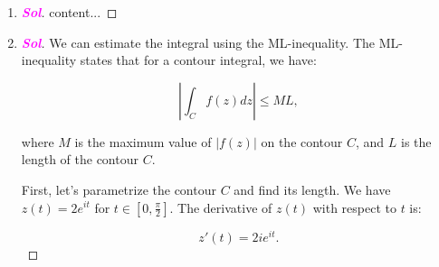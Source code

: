 \documentclass{article}
\theoremstyle{definition}
\newcommand{\sol}{\textcolor{magenta}{\bf Sol}}
\begin{document}
\begin{enumerate}
\begin{proof}[\sol]
\begin{itemize}
			\[
			I = \int_0^{2\pi} e^{-i\theta} e^{e^{i\theta}} d\theta.
			\]
			
			Now, consider the following function:
			
			\[
			f(z) = e^{z},
			\]
			
			where $z = e^{i\theta}$. We can compute the derivative of $f(z)$ with respect to $z$:
			
			\[
			f'(z) = e^{z}.
			\]
			
			Recall the Cauchy integral formula for a simple closed contour $\Gamma$:
			
			\[
			f(a) = \frac{1}{2\pi i} \oint_\Gamma \frac{f(z)}{z-a} dz,
			\]
			
			where $a$ is a point inside $\Gamma$. In our case, we can set $a = 0$ and consider the unit circle as our contour, i.e., $\Gamma: z = e^{i\theta}$.
			
			We want to find $I = \oint_\Gamma e^{-i\theta} f'(z) dz$. We have:
			
			\[
			I = \oint_\Gamma \frac{f'(z)}{z} dz = 2\pi i f(0),
			\]
			
			where the last equality follows from the Cauchy integral formula. Since $f(0) = e^0 = 1$, we have:
			
			\[
			I = 2\pi i.
			\]
			
			Therefore, the value of the given integral is:
			
			\[
			\int_0^{2\pi} e^{-i\theta} e^{e^{i\theta}} d\theta = 2\pi i.
			\]
			
		\end{itemize}
	\end{proof}
	\item 
	\begin{proof}[\sol]
		content...
	\end{proof}
	\item 
	\begin{proof}[\sol]
		We can estimate the integral using the ML-inequality. The ML-inequality states that for a contour integral, we have:
		
		\[
		\left|\int_C f(z) dz\right| \leq ML,
		\]
		
		where $M$ is the maximum value of $|f(z)|$ on the contour $C$, and $L$ is the length of the contour $C$.
		
		First, let's parametrize the contour $C$ and find its length. We have $z(t) = 2e^{it}$ for $t \in [0, \frac{\pi}{2}]$. The derivative of $z(t)$ with respect to $t$ is:
		
		\[
		z'(t) = 2ie^{it}.
		\]
		

\end{proof}
\end{enumerate}
\end{document}
